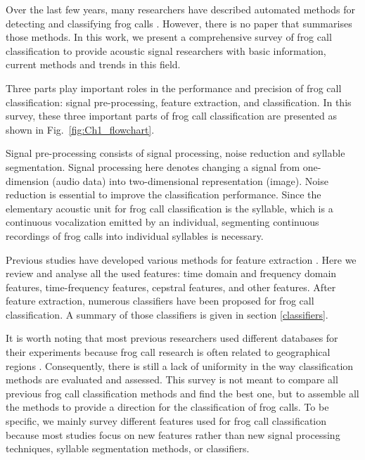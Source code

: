 Over the last few years, many researchers have described automated methods for detecting and classifying frog calls \citep{huang2008realization, huang2009frog, han2011acoustic,chen2012automatic, Gingras2013, camacho2013automatic, Huang20141}. However, there is no paper that summarises those methods. In this work, we present a comprehensive survey of frog call classification to provide acoustic signal researchers with basic information, current methods and trends in this field. 

Three parts play important roles in the performance and precision of frog call classification: signal pre-processing, feature extraction, and classification. In this survey, these three important parts of frog call classification are presented as shown in Fig.~\ref{fig:Ch1_flowchart}. 




Signal pre-processing consists of signal processing, noise reduction and syllable segmentation. Signal processing here denotes changing a signal from one-dimension (audio data) into two-dimensional representation (image). Noise reduction is essential to improve the classification performance. Since the elementary acoustic unit for frog call classification is the syllable, which is a continuous vocalization emitted by an individual, segmenting continuous recordings of frog calls into individual syllables is necessary. 

Previous studies have developed various methods for feature extraction \citep{huang2008realization, huang2009frog, han2011acoustic, chen2012automatic, Gingras2013, camacho2013automatic, Huang20141}. Here we review and analyse all the used features: time domain and frequency domain features, 
time-frequency features, cepstral features, and other features. After feature extraction, numerous classifiers have been proposed for frog call classification. A summary of those classifiers is given in section \ref{classifiers}.


It is worth noting that most previous researchers used different databases for their experiments because frog call research is often related to geographical regions \citep{jang2011geographic}. Consequently, there is still a lack of uniformity in the way classification methods are evaluated and assessed. This survey is not meant to compare all previous frog call classification methods and find the best one, but to assemble all the methods to provide a direction for the classification of frog calls. To be specific, we mainly survey different features used for frog call classification because most studies focus on new features rather than new signal processing techniques, syllable segmentation methods, or classifiers.

